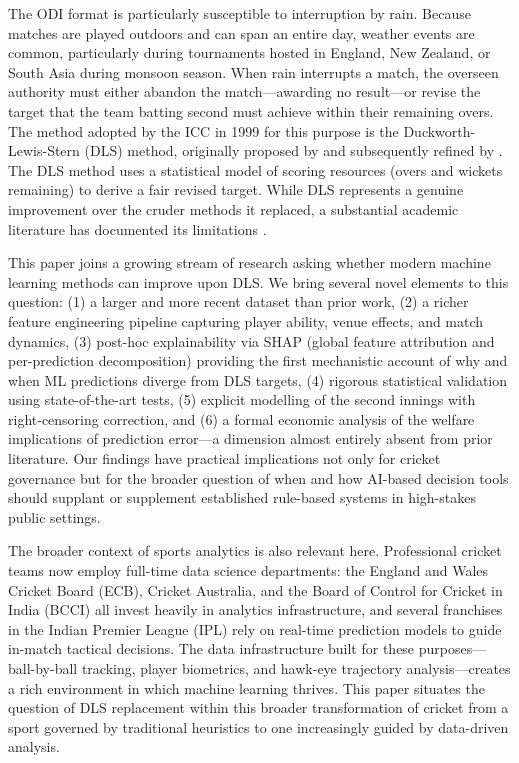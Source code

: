 \documentclass[10pt,a4paper,twocolumn]{article}
\begin{document}
The ODI format is particularly susceptible to interruption by rain. Because matches are played outdoors and can span an entire day, weather events are common, particularly during tournaments hosted in England, New Zealand, or South Asia during monsoon season. When rain interrupts a match, the overseen authority must either abandon the match---awarding no result---or revise the target that the team batting second must achieve within their remaining overs. The method adopted by the ICC in 1999 for this purpose is the Duckworth-Lewis-Stern (DLS) method, originally proposed by \citet{Duckworth1998} and subsequently refined by \citet{Stern2016}. The DLS method uses a statistical model of scoring resources (overs and wickets remaining) to derive a fair revised target. While DLS represents a genuine improvement over the cruder methods it replaced, a substantial academic literature has documented its limitations \citep{McHale2011, Bhattacharya2011, Carter2004}.

This paper joins a growing stream of research asking whether modern machine learning methods can improve upon DLS. We bring several novel elements to this question: (1) a larger and more recent dataset than prior work, (2) a richer feature engineering pipeline capturing player ability, venue effects, and match dynamics, (3) post-hoc explainability via SHAP (global feature attribution and per-prediction decomposition) providing the first mechanistic account of why and when ML predictions diverge from DLS targets, (4) rigorous statistical validation using state-of-the-art tests, (5) explicit modelling of the second innings with right-censoring correction, and (6) a formal economic analysis of the welfare implications of prediction error---a dimension almost entirely absent from prior literature. Our findings have practical implications not only for cricket governance but for the broader question of when and how AI-based decision tools should supplant or supplement established rule-based systems in high-stakes public settings.

The broader context of sports analytics is also relevant here. Professional cricket teams now employ full-time data science departments: the England and Wales Cricket Board (ECB), Cricket Australia, and the Board of Control for Cricket in India (BCCI) all invest heavily in analytics infrastructure, and several franchises in the Indian Premier League (IPL) rely on real-time prediction models to guide in-match tactical decisions. The data infrastructure built for these purposes---ball-by-ball tracking, player biometrics, and hawk-eye trajectory analysis---creates a rich environment in which machine learning thrives. This paper situates the question of DLS replacement within this broader transformation of cricket from a sport governed by traditional heuristics to one increasingly guided by data-driven analysis.
\end{document}
